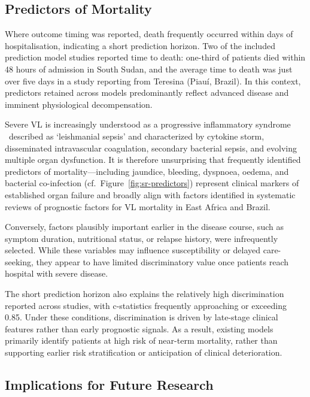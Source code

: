 \subsection{Predictors of Mortality}

Where outcome timing was reported, death frequently occurred within days of hospitalisation, indicating a short prediction horizon. Two of the included prediction model studies reported time to death: one-third of patients died within 48 hours of admission in South Sudan\cite{kaminkClinicalSeverityScoring2017}, and the average time to death was just over five days in a study reporting from Teresina (Piauí, Brazil)\cite{werneckPrognosticFactorsDeath2003}. In this context, predictors retained across models predominantly reflect advanced disease and imminent physiological decompensation.

Severe VL is increasingly understood as a progressive inflammatory syndrome \textemdash\ described as `leishmanial sepsis' and characterized by cytokine storm, disseminated intravascular coagulation, secondary bacterial sepsis, and evolving multiple organ dysfunction\cite{costa2023}. It is therefore unsurprising that frequently identified predictors of mortality—including jaundice, bleeding, dyspnoea, oedema, and bacterial co-infection (cf.\ Figure~\ref{fig:sr-predictors}) represent clinical markers of established organ failure and broadly align with factors identified in systematic reviews of prognostic factors for VL mortality in East Africa\cite{abongomera2020} and Brazil\cite{beloRiskFactorsAdverse2014}.

Conversely, factors plausibly important earlier in the disease course, such as symptom duration, nutritional status, or relapse history, were infrequently selected. While these variables may influence susceptibility or delayed care-seeking, they appear to have limited discriminatory value once patients reach hospital with severe disease.

The short prediction horizon also explains the relatively high discrimination reported across studies, with c-statistics frequently approaching or exceeding 0.85. Under these conditions, discrimination is driven by late-stage clinical features rather than early prognostic signals. As a result, existing models primarily identify patients at high risk of near-term mortality, rather than supporting earlier risk stratification or anticipation of clinical deterioration.

\subsection{Implications for Future Research}

